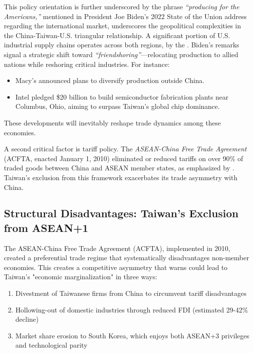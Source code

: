 \documentclass{article}
\begin{document}
This policy orientation is further underscored by the phrase \textit{``producing for the Americans,''} mentioned in President Joe Biden's 2022 State of the Union address regarding the international market, underscores the geopolitical complexities in the China-Taiwan-U.S. triangular relationship. A significant portion of U.S. industrial supply chains operates across both regions, by the \cite{us_department_state_biden_sotu}. Biden's remarks signal a strategic shift toward \textit{``friendshoring''}—relocating production to allied nations while reshoring critical industries. For instance:
\begin{itemize}
    \item Macy's announced plans to diversify production outside China.
    \item Intel pledged \$20 billion to build semiconductor fabrication plants near Columbus, Ohio, aiming to surpass Taiwan's global chip dominance.
\end{itemize}
These developments will inevitably reshape trade dynamics among these economies.

A second critical factor is tariff policy. The \textit{ASEAN-China Free Trade Agreement} (ACFTA, enacted January 1, 2010) eliminated or reduced tariffs on over 90\% of traded goods between China and ASEAN member states, as emphasized by \cite{feddersen_china_strategies_towards_taiwan}. Taiwan's exclusion from this framework exacerbates its trade asymmetry with China.

\subsection{Structural Disadvantages: Taiwan's Exclusion from ASEAN+1}

The ASEAN-China Free Trade Agreement (ACFTA), implemented in 2010, created a preferential trade regime that systematically disadvantages non-member economies. This creates a competitive asymmetry that \cite{chou_economy_cooperation_framework_agreement} warns could lead to Taiwan's "economic marginalization" in three ways:

\begin{enumerate}
    \item Divestment of Taiwanese firms from China to circumvent tariff disadvantages
    \item Hollowing-out of domestic industries through reduced FDI (estimated 29-42\% decline)
    \item Market share erosion to South Korea, which enjoys both ASEAN+3 privileges and technological parity
\end{enumerate}
\end{document}
